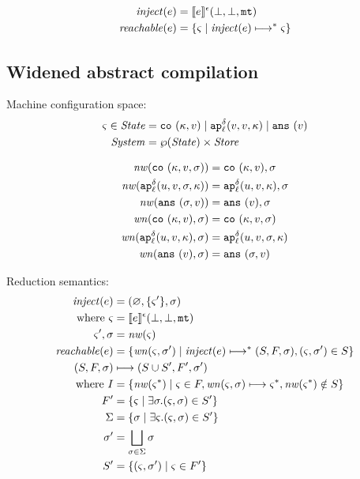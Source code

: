 \documentclass{llncs}
\newcommand{\inject}{\mathit{inject}}
\newcommand{\setof}[1]{\{ #1 \}}
\newcommand{\alt}{\mid}
\begin{document}
\begin{align*}
\inject(\mexp) &= \compile{\mexp}^{\mtcntr}(\bot,\bot,\kmt) \\
\reachable{\mexp} &= \setof{\mstate \mid \inject(\mexp) \machstep^* \mstate}
\end{align*}

\subsection{Widened abstract compilation}

Machine configuration space:
\begin{align*}
\mstate \in \State &= \co{\mkont, \mval} \alt
                     \ap[_\mlab^\mcntr]{\mval,\mval,\mkont} \alt
                     \ans{\mval} \\
\System &= \wp(\State) \times \Store
\end{align*}

\begin{align*}
\nw(\co{\mkont,\mval,\msto}) &= \co{\mkont, \mval}, \msto \\
\nw(\ap[^\mcntr_\mlab]{\mvalx{u},\mval,\msto,\mkont}) &= \ap[^\mcntr_\mlab]{\mvalx{u},\mval,\mkont}, \msto \\
\nw(\ans{\msto,\mval}) &= \ans{\mval}, \msto \\
\wn(\co{\mkont,\mval},\msto) &= \co{\mkont,\mval,\msto} \\
\wn(\ap[^\mcntr_\mlab]{\mvalx{u},\mval,\mkont},\msto) &= \ap[^\mcntr_\mlab]{\mvalx{u},\mval,\msto,\mkont} \\
\wn(\ans{\mval},\msto) &= \ans{\msto,\mval}
\end{align*}

Reduction semantics:
\begin{align*}
\inject(\mexp) &= (\varnothing,\setof{\mstate'},\msto) \\
 \text{ where } \mstate &= \compile{\mexp}^{\mtcntr}(\bot,\bot,\kmt) \\
                \mstate', \msto &= \nw(\mstate) \\
\reachable{\mexp} &= \setof{\wn(\mstate,\msto') \mid
                             \inject(\mexp) \machstep^* (S,F,\msto),
                             \ttuple{\mstate}{\msto'} \in S} \\
(S,F,\msto) &\machstep (S \cup S', F', \msto') \\
 \text{ where }
  I &= \setof{ \nw(\mstate^*) \mid \mstate \in F, \wn(\mstate,\msto) \machstep \mstate^*, \nw(\mstate^*)\notin S} \\
  F' &= \setof{\mstate \mid \exists \msto. \ttuple{\mstate}{\msto} \in S'} \\
  \Sigma &= \setof{\msto \mid \exists \mstate. \ttuple{\mstate}{\msto} \in S'} \\
  \msto' &= \bigsqcup\limits_{\msto\in\Sigma}{\msto} \\
  S' &= \setof{\ttuple{\mstate}{\msto'} \mid \mstate \in F'}
\end{align*}
\end{document}
